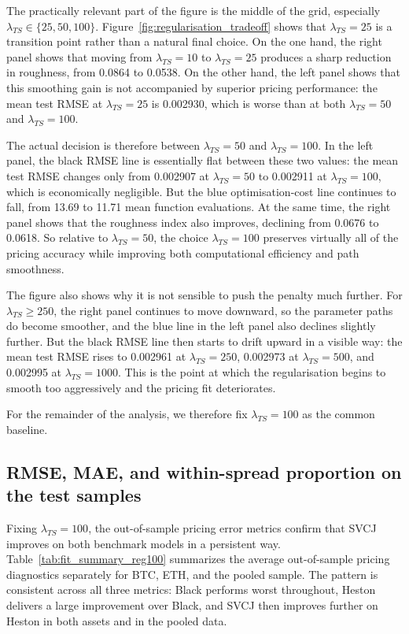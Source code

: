 \documentclass[a4paper,titlepage,12pt]{report}
\theoremstyle{plain}
\begin{document}
The practically relevant part of the figure is the middle of the grid, especially $\lambda_{TS}\in\{25,50,100\}$. Figure~\ref{fig:regularisation_tradeoff} shows that $\lambda_{TS}=25$ is a transition point rather than a natural final choice. On the one hand, the right panel shows that moving from $\lambda_{TS}=10$ to $\lambda_{TS}=25$ produces a sharp reduction in roughness, from 0.0864 to 0.0538. On the other hand, the left panel shows that this smoothing gain is not accompanied by superior pricing performance: the mean test RMSE at $\lambda_{TS}=25$ is 0.002930, which is worse than at both $\lambda_{TS}=50$ and $\lambda_{TS}=100$.

The actual decision is therefore between $\lambda_{TS}=50$ and $\lambda_{TS}=100$. In the left panel, the black RMSE line is essentially flat between these two values: the mean test RMSE changes only from 0.002907 at $\lambda_{TS}=50$ to 0.002911 at $\lambda_{TS}=100$, which is economically negligible. But the blue optimisation-cost line continues to fall, from 13.69 to 11.71 mean function evaluations. At the same time, the right panel shows that the roughness index also improves, declining from 0.0676 to 0.0618. So relative to $\lambda_{TS}=50$, the choice $\lambda_{TS}=100$ preserves virtually all of the pricing accuracy while improving both computational efficiency and path smoothness.

The figure also shows why it is not sensible to push the penalty much further. For $\lambda_{TS}\ge 250$, the right panel continues to move downward, so the parameter paths do become smoother, and the blue line in the left panel also declines slightly further. But the black RMSE line then starts to drift upward in a visible way: the mean test RMSE rises to 0.002961 at $\lambda_{TS}=250$, 0.002973 at $\lambda_{TS}=500$, and 0.002995 at $\lambda_{TS}=1000$. This is the point at which the regularisation begins to smooth too aggressively and the pricing fit deteriorates.

For the remainder of the analysis, we therefore fix $\lambda_{TS}=100$ as the common baseline.

\subsection{RMSE, MAE, and within-spread proportion on the test samples}\label{subsec:time_series_diagnostics}

Fixing $\lambda_{TS}=100$, the out-of-sample pricing error metrics confirm that SVCJ improves on both benchmark models in a persistent way. Table~\ref{tab:fit_summary_reg100} summarizes the average out-of-sample pricing diagnostics separately for BTC, ETH, and the pooled sample. The pattern is consistent across all three metrics: Black performs worst throughout, Heston delivers a large improvement over Black, and SVCJ then improves further on Heston in both assets and in the pooled data.
\end{document}
